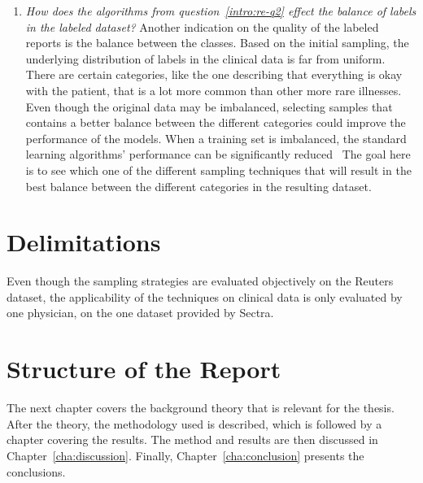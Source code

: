 \begin{enumerate}
  \item \label{intro:re-q3}
      \textit{How does the algorithms from question~\ref{intro:re-q2} effect the balance of labels in the labeled dataset?}
      Another indication on the quality of the labeled reports is the balance between the classes.
      Based on the initial sampling, the underlying distribution of labels in the clinical data is far from uniform.
      There are certain categories, like the one describing that everything is okay with the patient, that is a lot more common than other more rare illnesses.
      Even though the original data may be imbalanced, selecting samples that contains a better balance between the different categories could improve the performance of the models.
      When a training set is imbalanced, the standard learning algorithms' performance can be significantly reduced~\cite{he2009learning}
      The goal here is to see which one of the different sampling techniques that will result in the best balance between the different categories in the resulting dataset.

\end{enumerate}

\section{Delimitations}
\label{sec:delimitations}

Even though the sampling strategies are evaluated objectively on the Reuters dataset, the applicability of the techniques on clinical data is only evaluated by one physician, on the one dataset provided by Sectra.

\section{Structure of the Report}
\label{sec:structure}

The next chapter covers the background theory that is relevant for the thesis.
After the theory, the methodology used is described, which is followed by a chapter covering the results.
The method and results are then discussed in Chapter~\ref{cha:discussion}.
Finally, Chapter~\ref{cha:conclusion} presents the conclusions.
